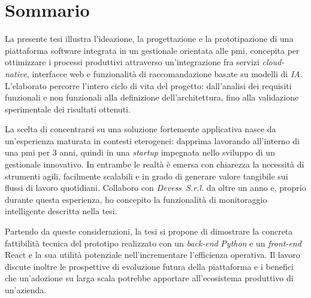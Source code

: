 \cleardoublepage
{}
{}
\begingroup
\let\clearpage\relax
\let\cleardoublepage\relax
\chapter*{Sommario}

La presente tesi illustra l’ideazione, la progettazione e la prototipazione di una piattaforma software 
integrata in un gestionale orientata alle \gls{pmi}, concepita per ottimizzare i processi produttivi 
attraverso un’integrazione fra servizi \textit{cloud\nobreakdash-native}, interfacce web e funzionalità 
di raccomandazione basate su modelli di \textit{IA}.  
L’elaborato percorre l’intero ciclo di vita del progetto: dall’analisi dei requisiti funzionali e non 
funzionali alla definizione dell’architettura, fino alla validazione sperimentale dei risultati ottenuti.

La scelta di concentrarsi su una soluzione fortemente applicativa nasce da un’esperienza maturata in 
contesti eterogenei: dapprima lavorando all’interno di una \gls{pmi} per 3 anni, quindi in una \textit{startup} impegnata 
nello sviluppo di un gestionale innovativo. In entrambe le realtà è emersa con chiarezza la necessità 
di strumenti agili, facilmente scalabili e in grado di generare valore tangibile sui flussi di lavoro 
quotidiani.  
Collaboro con \textit{Devess~S.r.l.} da oltre un anno e, proprio durante questa esperienza, 
ho concepito la funzionalità di monitoraggio intelligente descritta nella tesi.

Partendo da queste considerazioni, la tesi si propone di dimostrare la concreta fattibilità tecnica 
del prototipo realizzato con un \textit{back\nobreakdash-end} \textit{Python} e un 
\textit{front\nobreakdash-end} React e la sua utilità potenziale nell’incrementare l’efficienza 
operativa. Il lavoro discute inoltre le prospettive di evoluzione futura della piattaforma e i benefici 
che un’adozione su larga scala potrebbe apportare all’ecosistema produttivo di un'azienda.

\endgroup
\vfill
